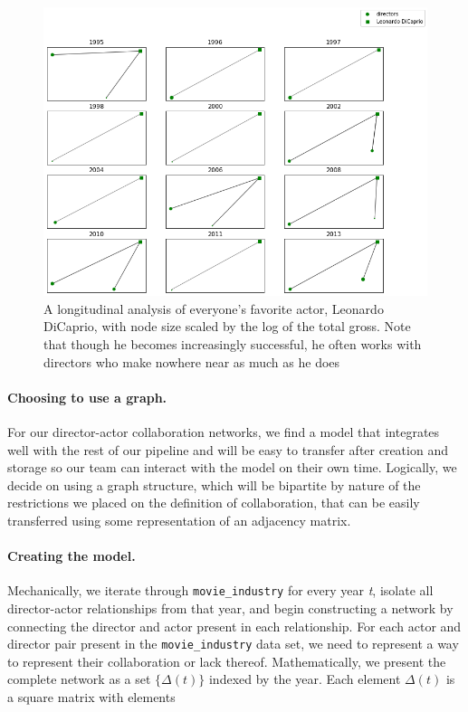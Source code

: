 \documentclass{article}
\begin{document}
\begin{figure}
    \centering
    \includegraphics[scale=0.5]{DiCaprio_Longitudinal_Network_2.png}
    \caption{A longitudinal analysis of everyone's favorite actor, Leonardo DiCaprio, with node size scaled by the log of the total gross. Note that though he becomes increasingly successful, he often works with directors who make nowhere near as much as he does}
    \label{fig:t-graph-fig-2}
\end{figure}

\paragraph{Choosing to use a graph.}
For our director-actor collaboration networks, we find a model that integrates well with the rest of our pipeline and will be easy to transfer after creation and storage so our team can interact with the model on their own time. Logically, we decide on using a graph structure, which will be bipartite by nature of the restrictions we placed on the definition of collaboration, that can be easily transferred using some representation of an adjacency matrix. 

\paragraph{Creating the model.}
Mechanically, we iterate through \texttt{movie\_industry} for every year \emph{t}, isolate all director-actor relationships from that year, and begin constructing a network by connecting the director and actor present in each relationship. For each actor and director pair present in the \texttt{movie\_industry} data set, we need to represent a way to represent their collaboration or lack thereof. Mathematically, we present the complete network as a set $\{\Delta(t)\}$ indexed by the year. Each element $\Delta(t)$ is a square matrix with elements
\end{document}

